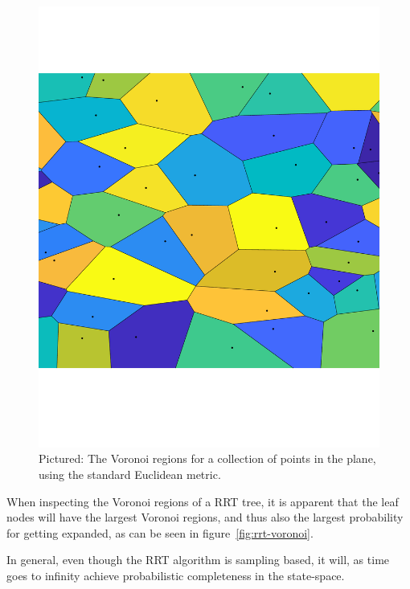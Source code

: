 \begin{figure}
  \centering \includegraphics[scale=.3]{figures/rrt/voronoi-diagram}
  \caption{Pictured: The Voronoi regions for a collection of points in the
    plane, using the standard Euclidean metric.}
  \label{fig:voronoi-diagram}
\end{figure}

When inspecting the Voronoi regions of a \ac{RRT} tree, it is apparent that the
leaf nodes will have the largest Voronoi regions, and thus also the largest
probability for getting expanded, as can be seen in
figure~\ref{fig:rrt-voronoi}.

In general, even though the \ac{RRT} algorithm is sampling based, it will, as
time goes to infinity achieve probabilistic completeness in the state-space.


